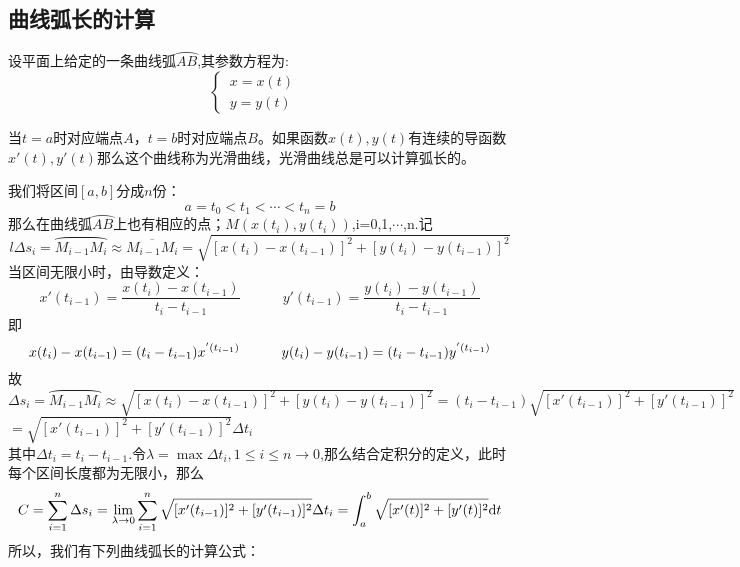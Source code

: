 \subsection{曲线弧长的计算}
设平面上给定的一条曲线弧$\wideparen{AB}$,其参数方程为:
\begin{equation}
	\begin{cases}
		\, x=x(t)\\
		 \, y=y(t)&
	\end{cases}
\end{equation}
\par 当$t=a$时对应端点$A$，$t=b$时对应端点$B$。如果函数$x(t),y(t)$有连续的导函数$x'(t),y'(t)$那么这个曲线称为光滑曲线，光滑曲线总是可以计算弧长的。
\par 我们将区间$[a,b]$分成$n$份：
\begin{equation}
	\nonumber
	a=t_0<t_1<\cdots<t_n=b
\end{equation}
那么在曲线弧$\wideparen{AB}$上也有相应的点；$M(x(t_i),y(t_i))$,i=0,1,$\cdots$,n.记
\begin{equation}l
	\Delta s_i=\wideparen{M_{i-1}M_i}\approx\overline{M_{i-1}M_i} =\sqrt{[x(t_i)-x(t_{i-1})]^2+[y(t_i)-y(t_{i-1})]^2}
\end{equation}
当区间无限小时，由导数定义：
\begin{equation}
	x'(t_{i-1})=\frac{x(t_i)-x(t_{i-1})}{t_i-t_{i-1}}\hspace{3em} y'(t_{i-1})=\frac{y(t_i)-y(t_{i-1})}{t_i-t_{i-1}}
\end{equation}
即
\begin{equation}
	x(t_i)-x(t_{i-1})=(t_i-t_{i-1})x^{'(t_{i-1})} \hspace*{3em}	y(t_i)-y(t_{i-1})=(t_i-t_{i-1})y^{'(t_{i-1})}
\end{equation}
故\\
$\Delta s_i=\wideparen{M_{i-1}M_i}\approx \sqrt{[x(t_i)-x(t_{i-1})]^2+[y(t_i)-y(t_{i-1})]^2}=(t_i-t_{i-1})\sqrt{[x'(t_{i-1})]^2+[y'(t_{i-1})]^2}$\\
\hspace*{5.8em}$=\sqrt{[x'(t_{i-1})]^2+[y'(t_{i-1})]^2}\Delta t_i$\\
其中$\Delta t_i=t_i-t_{i-1}$.令$\lambda=\max{\Delta t_i,1\leq i\leq n}\to0$,那么结合定积分的定义，此时每个区间长度都为无限小，那么
\begin{equation}
	C=\sum_{i=1}^{n}\Delta s_i=\lim\limits_{\lambda\to 0}\sum_{i=1}^{n}\sqrt{[x'(t_{i-1})]^2+[y'(t_{i-1})]^2}\Delta t_i=\int_{a}^{b}\sqrt{[x'(t)]^2+[y'(t)]^2}{\rm{d}} t
\end{equation}
所以，我们有下列曲线弧长的计算公式：
